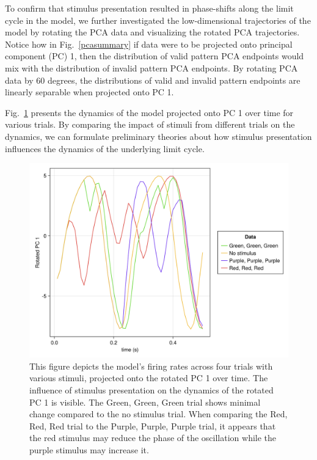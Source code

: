 \documentclass[conference]{IEEEtran}
\begin{document}
To confirm that stimulus presentation resulted in phase-shifts along the limit cycle in the model, we further investigated the low-dimensional trajectories of the model by rotating the PCA data and visualizing the rotated PCA trajectories. Notice how in Fig.~\ref{pcasummary} if data were to be projected onto principal component (PC) 1, then the distribution of valid pattern PCA endpoints would mix with the distribution of invalid pattern PCA endpoints. By rotating PCA data by $60$ degrees, the distributions of valid and invalid pattern endpoints are linearly separable when projected onto PC 1.

Fig.~\ref{pcaacceptedsets} presents the dynamics of the model projected onto PC 1 over time for various trials. By comparing the impact of stimuli from different trials on the dynamics, we can formulate preliminary theories about how stimulus presentation influences the dynamics of the underlying limit cycle.  

\begin{figure}[htbp]
\centerline{\includegraphics[scale=0.10]{rotated_pc1_accepted.png}}
\caption{This figure depicts the model's firing rates across four trials with various stimuli, projected onto the rotated PC 1 over time. The influence of stimulus presentation on the dynamics of the rotated PC 1 is visible. The Green, Green, Green trial shows minimal change compared to the no stimulus trial. When comparing the Red, Red, Red trial to the Purple, Purple, Purple trial, it appears that the red stimulus may reduce the phase of the oscillation while the purple stimulus may increase it.}
\label{pcaacceptedsets}
\end{figure}
\end{document}
